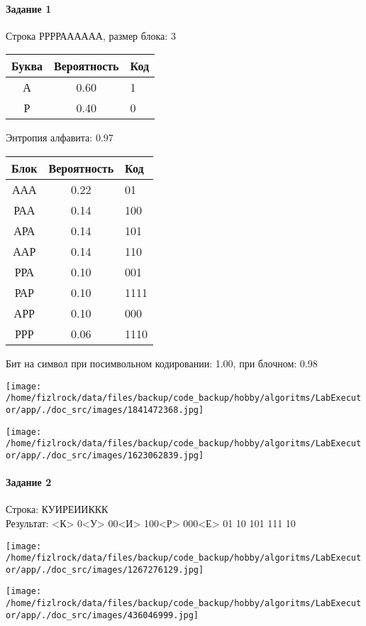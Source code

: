 \documentclass[a4paper, 12pt]{article}
\begin{document}
\paragraph{Задание 1}

Строка РРРРАААААА, размер блока: 3
\begin{center}
 \begin{tabular}{ |c|c|l| } 
  \hline
     Буква & Вероятность & Код\\ \hline
А & 0.60 & 1\\\hline
Р & 0.40 & 0
\\ \hline \end{tabular}
\end{center}
Энтропия алфавита: 0.97
\begin{center}
 \begin{tabular}{ |c|c|l| } 
  \hline
     Блок & Вероятность & Код\\ \hline
ААА & 0.22 & 01\\\hline
РАА & 0.14 & 100\\\hline
АРА & 0.14 & 101\\\hline
ААР & 0.14 & 110\\\hline
РРА & 0.10 & 001\\\hline
РАР & 0.10 & 1111\\\hline
АРР & 0.10 & 000\\\hline
РРР & 0.06 & 1110
\\ \hline \end{tabular}
\end{center}
Бит на символ при посимвольном кодировании: 1.00, при блочном: 0.98

\texttt{[image: /home/fizlrock/data/files/backup/code\_backup/hobby/algoritms/LabExecutor/app/./doc\_src/images/1841472368.jpg]}

\texttt{[image: /home/fizlrock/data/files/backup/code\_backup/hobby/algoritms/LabExecutor/app/./doc\_src/images/1623062839.jpg]}
\pagebreak
\paragraph{Задание 2}

Строка: 
КУИРЕИИККК\\
Результат: <К> 0<У> 00<И> 100<Р> 000<Е> 01 10 101 111 10

\texttt{[image: /home/fizlrock/data/files/backup/code\_backup/hobby/algoritms/LabExecutor/app/./doc\_src/images/1267276129.jpg]}

\texttt{[image: /home/fizlrock/data/files/backup/code\_backup/hobby/algoritms/LabExecutor/app/./doc\_src/images/436046999.jpg]}
\end{document}
